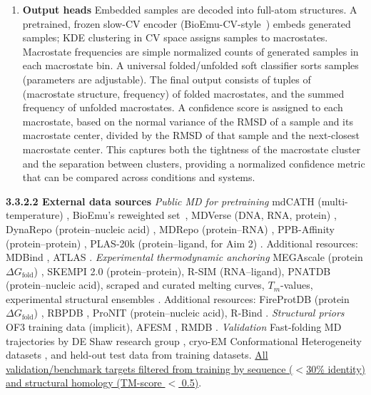 \documentclass[11pt]{article}
\begin{document}
\begin{enumerate}
\item \textbf{Output heads} Embedded samples are decoded into full-atom structures. A pretrained, frozen slow-CV encoder (BioEmu-CV-style~\cite{liu_Memory_2025,mehdi_Enhanced_2024}) embeds generated samples; KDE clustering in CV space assigns samples to macrostates. Macrostate frequencies are simple normalized counts of generated samples in each macrostate bin. A universal folded/unfolded soft classifier sorts samples (parameters are adjustable). The final output consists of tuples of (macrostate structure, frequency) of folded macrostates, and the summed frequency of unfolded macrostates. A confidence score is assigned to each macrostate, based on the normal variance of the RMSD of a sample and its macrostate center, divided by the RMSD of that sample and the next-closest macrostate center. This captures both the tightness of the macrostate cluster and the separation between clusters, providing a normalized confidence metric that can be compared across conditions and systems.

\end{enumerate} 

\textbf{3.3.2.2 External data sources} \emph{Public MD for pretraining} mdCATH (multi-temperature) \cite{mirarchi_mdCATH_2024}, BioEmu's reweighted set~\cite{lewis_Scalable_2025}, MDVerse (DNA, RNA,  protein) \cite{tiemann_MDverse_2024}, DynaRepo (protein--nucleic acid) \cite{mokhtari_DynaRepo_2026}, MDRepo (protein--RNA) \cite{roy_MDRepo_2025}, PPB-Affinity (protein--protein) \cite{liu_PPBAffinity_2024},  PLAS-20k (protein--ligand, for Aim 2) \cite{korlepara_PLAS20k_2024}. Additional resources: MDBind \cite{libouban_Spatiotemporal_2025}, ATLAS \cite{vandermeersche_ATLAS_2024}. \emph{Experimental thermodynamic anchoring} MEGAscale (protein $\Delta G_\text{fold}$) \cite{tsuboyama_Megascale_2023}, SKEMPI 2.0 \cite{jankauskaitė_SKEMPI_2019} (protein--protein), R-SIM \cite{ramaswamykrishnan_RSIM_2023} (RNA--ligand), PNATDB \cite{mei_Thermodynamic_2023} (protein--nucleic acid), scraped and curated melting curves, $T_m$-values, experimental structural ensembles \cite{berman_protein_2000}. Additional resources: FireProtDB (protein $\Delta G_\text{fold}$) \cite{musil_FireProtDB_2026} , RBPDB \cite{cook_RBPDB_2011}, ProNIT \cite{kumar_ProTherm_2006} (protein--nucleic acid), R-Bind \cite{donlic_RBIND_2022}. \emph{Structural priors} OF3 training data (implicit)\cite{theopenfold3team_OpenFold3preview_2025}, AFESM \cite{dinh_Compressing_2026}, RMDB \cite{cordero_RNA_2012}. \emph{Validation} Fast-folding MD trajectories by DE Shaw research group \cite{lewis_Scalable_2025}, cryo-EM Conformational Heterogeneity datasets \cite{astore_Inaugural_2025}, and held-out test data from training datasets. \uline{All validation/benchmark targets filtered from training by sequence ($<$30\% identity) and structural homology (TM-score $<$ 0.5)}.
\end{document}
